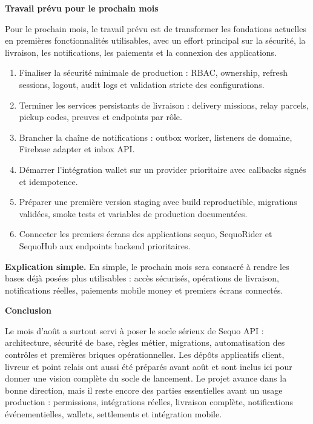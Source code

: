\documentclass[11pt,letterpaper]{article}
\newcommand{\sectiontitle}[1]{%
  \vspace{0.55em}
  {\Large\bfseries\color{SequoInk}#1}\par
  \vspace{0.1em}
}
\newcommand{\simpleexplanation}[1]{%
  {\small\textbf{\color{SequoBlue}Explication simple.} \color{SequoMuted}#1\par}
}
\begin{document}
\sectiontitle{Travail prévu pour le prochain mois}
Pour le prochain mois, le travail prévu est de transformer les fondations actuelles en premières fonctionnalités utilisables, avec un effort principal sur la sécurité, la livraison, les notifications, les paiements et la connexion des applications.

\begin{enumerate}
  \item Finaliser la sécurité minimale de production : RBAC, ownership, refresh sessions, logout, audit logs et validation stricte des configurations.
  \item Terminer les services persistants de livraison : delivery missions, relay parcels, pickup codes, preuves et endpoints par rôle.
  \item Brancher la chaîne de notifications : outbox worker, listeners de domaine, Firebase adapter et inbox API.
  \item Démarrer l'intégration wallet sur un provider prioritaire avec callbacks signés et idempotence.
  \item Préparer une première version staging avec build reproductible, migrations validées, smoke tests et variables de production documentées.
  \item Connecter les premiers écrans des applications sequo, SequoRider et SequoHub aux endpoints backend prioritaires.
\end{enumerate}
\simpleexplanation{En simple, le prochain mois sera consacré à rendre les bases déjà posées plus utilisables : accès sécurisés, opérations de livraison, notifications réelles, paiements mobile money et premiers écrans connectés.}

\sectiontitle{Conclusion}
Le mois d'août a surtout servi à poser le socle sérieux de Sequo API : architecture, sécurité de base, règles métier, migrations, automatisation des contrôles et premières briques opérationnelles. Les dépôts applicatifs client, livreur et point relais ont aussi été préparés avant août et sont inclus ici pour donner une vision complète du socle de lancement. Le projet avance dans la bonne direction, mais il reste encore des parties essentielles avant un usage production : permissions, intégrations réelles, livraison complète, notifications événementielles, wallets, settlements et intégration mobile.

\end{document}
